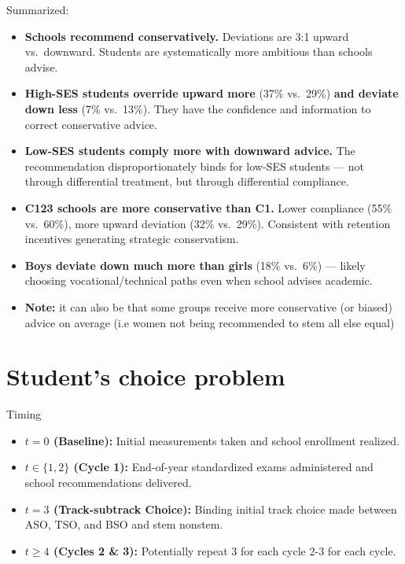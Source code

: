 \documentclass[10pt,aspectratio=169]{beamer}
\begin{document}
\begin{frame}{Summarized:}
\small

\begin{itemize}\setlength\itemsep{4pt}
  \item \textbf{Schools recommend conservatively.} Deviations are 3:1 upward vs.\ downward. Students are systematically more ambitious than schools advise.
  \item \textbf{High-SES students override upward more} (37\% vs.\ 29\%) \textbf{and deviate down less} (7\% vs.\ 13\%). They have the confidence and information to correct conservative advice.
  \item \textbf{Low-SES students comply more with downward advice.} The recommendation disproportionately binds for low-SES students --- not through differential treatment, but through differential compliance.
  \item \textbf{C123 schools are more conservative than C1.} Lower compliance (55\% vs.\ 60\%), more upward deviation (32\% vs.\ 29\%). Consistent with retention incentives generating strategic conservatism.
  \item \textbf{Boys deviate down much more than girls} (18\% vs.\ 6\%) --- likely choosing vocational/technical paths even when school advises academic. 
  \item \textbf{Note:} it can also be that some groups receive more conservative (or biased) advice on average (i.e women not being recommended to stem all else equal)
\end{itemize}

\bigskip
\end{frame}



\section{Student's choice problem}


\begin{frame}{Timing}
    \begin{itemize}
        \item \textbf{$t=0$ (Baseline):} Initial measurements taken and school enrollment realized.
        \item \textbf{$t \in \{1, 2\}$ (Cycle 1):} End-of-year standardized exams administered and school recommendations delivered.
        \item \textbf{$t=3$ (Track-subtrack Choice):} Binding initial track choice made between ASO, TSO, and BSO and stem nonstem.
        \item \textbf{$t \ge 4$ (Cycles 2 \& 3):} Potentially repeat 3 for each cycle 2-3 for each cycle.
    \end{itemize}
\end{frame}
\end{document}
